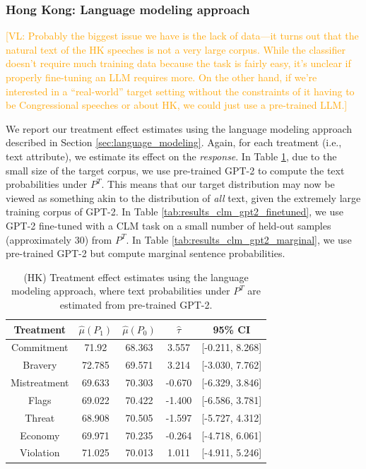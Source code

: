 \documentclass{article}
\newcommand{\vl}[1]{\textcolor{orange}{[VL: #1]}}
\begin{document}
\subsubsection{Hong Kong: Language modeling approach}

\vl{Probably the biggest issue we have is the lack of data---it turns out that the natural text of the HK speeches is not a very large corpus. While the classifier doesn't require much training data because the task is fairly easy, it's unclear if properly fine-tuning an LLM requires more.
\newline
\newline
On the other hand, if we're interested in a ``real-world'' target setting without the constraints of it having to be Congressional speeches or about HK, we could just use a pre-trained LLM.}

We report our treatment effect estimates using the language modeling approach described in Section \ref{sec:language_modeling}. Again, for each treatment (i.e., text attribute), we estimate its effect on the \textit{response}. In Table \ref{tab:results_clm_gpt2}, due to the small size of the target corpus, we use pre-trained GPT-2 \cite{radford2019language} to compute the text probabilities under $P^T$. This means that our target distribution may now be viewed as something akin to the distribution of \textit{all} text, given the extremely large training corpus of GPT-2. In Table \ref{tab:results_clm_gpt2_finetuned}, we use GPT-2 fine-tuned with a CLM task on a small number of held-out samples (approximately 30) from $P^T$. In Table \ref{tab:results_clm_gpt2_marginal}, we use pre-trained GPT-2 but compute marginal sentence probabilities.

\begin{table}[!ht]
    \centering
    \begin{tabular}{c|cccc}
        \toprule
        Treatment & $\hat{\mu}(P_1)$ & $\hat{\mu}(P_0)$ & $\hat{\tau}$ & 95\% CI \\
        \midrule
        Commitment & 71.92 & 68.363 & \textcolor{green!50!black}{3.557} & [-0.211, 8.268] \\
        Bravery & 72.785 & 69.571 & \textcolor{green!50!black}{3.214} & [-3.030, 7.762]  \\
        Mistreatment & 69.633 & 70.303 & \textcolor{red!80!black}{-0.670} & [-6.329, 3.846]  \\
        Flags & 69.022 & 70.422 & \textcolor{red!80!black}{-1.400} & [-6.586, 3.781] \\
        Threat & 68.908 & 70.505 & \textcolor{red!80!black}{-1.597} & [-5.727, 4.312] \\
        Economy & 69.971 & 70.235 & \textcolor{red!80!black}{-0.264} & [-4.718, 6.061] \\
        Violation & 71.025 & 70.013 & \textcolor{green!50!black}{1.011} & [-4.911, 5.246] \\
        \bottomrule
    \end{tabular}
    \caption{(HK) Treatment effect estimates using the language modeling approach, where text probabilities under $P^T$ are estimated from pre-trained GPT-2.}
    \label{tab:results_clm_gpt2}
\end{table}
\end{document}
